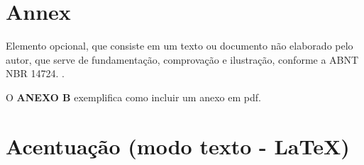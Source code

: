 \begin{anexosenv}

\partanexos

\chapter{Annex}\label{ch:annex}
Elemento opcional, que consiste em um texto ou documento não elaborado pelo autor, que serve de fundamentação,
comprovação e ilustração, conforme a ABNT NBR 14724. \cite{nbr14724}.

O \textbf{ANEXO B} exemplifica como incluir um anexo em pdf.

\chapter{Acentuação (modo texto - \LaTeX)}\label{ch:etc}

\end{anexosenv}
